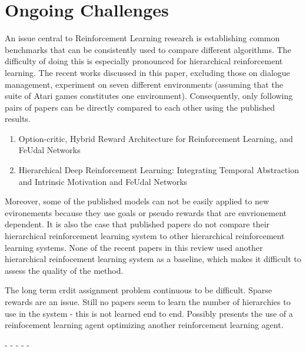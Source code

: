 \section{Ongoing Challenges}
An issue central to Reinforcement Learning research is establishing common benchmarks
that can be consistently used to compare different algorithms. The difficulty of
doing this is especially pronounced for hierarchical reinforcement learning.
The recent works discussed in this paper, excluding those on dialogue management,
experiment on seven different environments (assuming that the suite of Atari games
constitutes one environment). Consequently, only following pairs of papers
can be directly compared to each other using the published results.

\begin{enumerate}
    \item Option-critic, Hybrid Reward Architecture for Reinforcement Learning, and
          FeUdal Networks
    \item Hierarchical Deep Reinforcement Learning: Integrating Temporal Abstraction
          and Intrinsic Motivation and FeUdal Networks
\end{enumerate}

Moreover, some of the published models can not be easily applied to new evironements because
they use goals or pseudo rewards that are envrionement dependent. It is also the case
that published papers do not compare their hierarchical reinforcement learning system to
other hierarchical reinforcement learning systems. None of the recent papers in this review
used another hierarchical reinfocement learning system as a baseline, which makes it difficult
to assess the quality of the method.

The long term crdit assignment problem continuous to be difficult. Sparse rewards are an issue.
Still no papers seem to learn the number of hierarchies to use in the system - this is not learned
end to end. Possibly presents the use of a reinfocement learning agent optimizing another reinforcement
learning agent.


-
-
-
-
-
